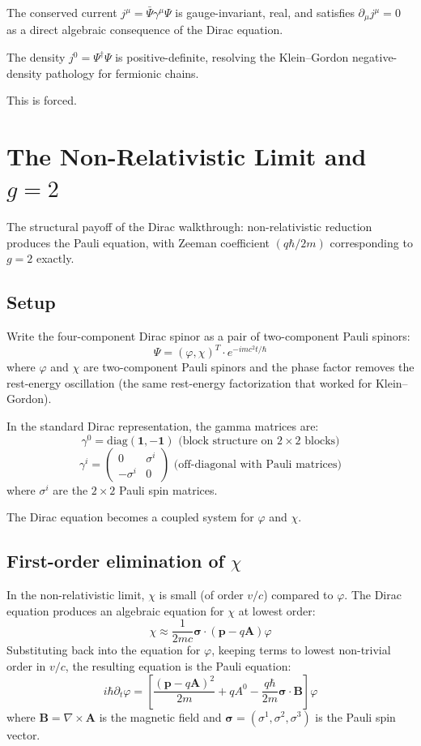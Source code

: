 \documentclass[11pt,a4paper]{article}
\begin{document}
The conserved current $j^\mu = \bar\Psi\gamma^\mu\Psi$ is gauge-invariant, real, and satisfies $\partial_\mu j^\mu = 0$ as a direct algebraic consequence of the Dirac equation.

The density $j^0 = \Psi^\dagger\Psi$ is positive-definite, resolving the Klein--Gordon negative-density pathology for fermionic chains.

This is forced.

\section{The Non-Relativistic Limit and $g = 2$}

The structural payoff of the Dirac walkthrough: non-relativistic reduction produces the Pauli equation, with Zeeman coefficient $(q\hbar/2m)$ corresponding to $g = 2$ exactly.

\subsection{Setup}

Write the four-component Dirac spinor as a pair of two-component Pauli spinors:
\[
\Psi = (\varphi, \chi)^T \cdot e^{-imc^{2}t/\hbar}
\]
where $\varphi$ and $\chi$ are two-component Pauli spinors and the phase factor removes the rest-energy oscillation (the same rest-energy factorization that worked for Klein--Gordon).

In the standard Dirac representation, the gamma matrices are:
\[
\gamma^0 = \mathrm{diag}(\mathbf{1}, -\mathbf{1}) \text{ (block structure on } 2\times 2 \text{ blocks)}
\]
\[
\gamma^i = \begin{pmatrix} 0 & \sigma^i \\ -\sigma^i & 0 \end{pmatrix} \text{ (off-diagonal with Pauli matrices)}
\]
where $\sigma^i$ are the $2\times 2$ Pauli spin matrices.

The Dirac equation becomes a coupled system for $\varphi$ and $\chi$.

\subsection{First-order elimination of $\chi$}

In the non-relativistic limit, $\chi$ is small (of order $v/c$) compared to $\varphi$. The Dirac equation produces an algebraic equation for $\chi$ at lowest order:
\[
\chi \approx \frac{1}{2mc}\boldsymbol{\sigma}\cdot(\mathbf{p} - q\mathbf{A})\varphi
\]
Substituting back into the equation for $\varphi$, keeping terms to lowest non-trivial order in $v/c$, the resulting equation is the Pauli equation:
\[
i\hbar\partial_t\varphi = \left[\frac{(\mathbf{p} - q\mathbf{A})^2}{2m} + qA^0 - \frac{q\hbar}{2m}\boldsymbol{\sigma}\cdot\mathbf{B}\right]\varphi
\]
where $\mathbf{B} = \nabla\times\mathbf{A}$ is the magnetic field and $\boldsymbol{\sigma} = (\sigma^1, \sigma^2, \sigma^3)$ is the Pauli spin vector.
\end{document}
